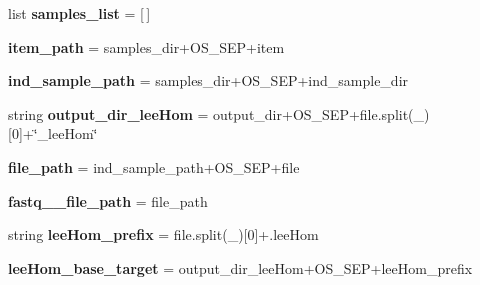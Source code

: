\begin{DoxyCompactItemize}
\item 
list {\bfseries samples\+\_\+list} = \mbox{[}$\,$\mbox{]}\hypertarget{namespaceNGSXtrimmerge_a22e8e4a1e8b20a9442d36e4dae21e4ec}{}\label{namespaceNGSXtrimmerge_a22e8e4a1e8b20a9442d36e4dae21e4ec}

\item 
{\bfseries item\+\_\+path} = samples\+\_\+dir+O\+S\+\_\+\+S\+EP+item\hypertarget{namespaceNGSXtrimmerge_aee44efd02210b3f141d8f575205c3c26}{}\label{namespaceNGSXtrimmerge_aee44efd02210b3f141d8f575205c3c26}

\item 
{\bfseries ind\+\_\+sample\+\_\+path} = samples\+\_\+dir+O\+S\+\_\+\+S\+EP+ind\+\_\+sample\+\_\+dir\hypertarget{namespaceNGSXtrimmerge_a1000568e536dec4534df495688bf973b}{}\label{namespaceNGSXtrimmerge_a1000568e536dec4534df495688bf973b}

\item 
string {\bfseries output\+\_\+dir\+\_\+lee\+Hom} = output\+\_\+dir+O\+S\+\_\+\+S\+EP+file.\+split(\textquotesingle{}\+\_\+\textquotesingle{})\mbox{[}0\mbox{]}+\char`\"{}\+\_\+lee\+Hom\char`\"{}\hypertarget{namespaceNGSXtrimmerge_ab165d5bfbac14e59b0bfd798ba6f4019}{}\label{namespaceNGSXtrimmerge_ab165d5bfbac14e59b0bfd798ba6f4019}

\item 
{\bfseries file\+\_\+path} = ind\+\_\+sample\+\_\+path+O\+S\+\_\+\+S\+EP+file\hypertarget{namespaceNGSXtrimmerge_a05339429e7a0152686def01327c950c0}{}\label{namespaceNGSXtrimmerge_a05339429e7a0152686def01327c950c0}

\item 
{\bfseries fastq\+\_\+\_\+file\+\_\+path} = file\+\_\+path\hypertarget{namespaceNGSXtrimmerge_a0f121912ae7dab8742ac959b1def6880}{}\label{namespaceNGSXtrimmerge_a0f121912ae7dab8742ac959b1def6880}

\item 
string {\bfseries lee\+Hom\+\_\+prefix} = file.\+split(\textquotesingle{}\+\_\+\textquotesingle{})\mbox{[}0\mbox{]}+\textquotesingle{}.lee\+Hom\textquotesingle{}\hypertarget{namespaceNGSXtrimmerge_a7792c71b4064aa7283cfd8ae3d4224d9}{}\label{namespaceNGSXtrimmerge_a7792c71b4064aa7283cfd8ae3d4224d9}

\item 
{\bfseries lee\+Hom\+\_\+base\+\_\+target} = output\+\_\+dir\+\_\+lee\+Hom+O\+S\+\_\+\+S\+EP+lee\+Hom\+\_\+prefix\hypertarget{namespaceNGSXtrimmerge_a0a5f91116b3f0c835e8584e5ec6a790f}{}\label{namespaceNGSXtrimmerge_a0a5f91116b3f0c835e8584e5ec6a790f}


\end{DoxyCompactItemize}
